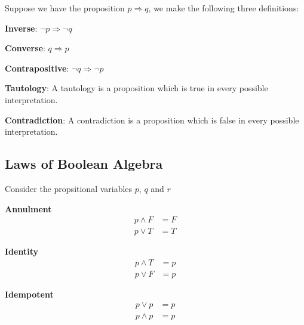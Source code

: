 \newpage
\noindent Suppose we have the proposition $p \Rightarrow q$, we make the following three definitions:
\begin{defn}\label{mod1:defn:Inverse}
	\textbf{Inverse}: $\lnot p \Rightarrow \lnot q$ 
\end{defn}

\begin{defn}\label{mod1:defn:Converse}
	\textbf{Converse}: $q \Rightarrow p$ 
\end{defn}

\begin{defn}\label{mod1:defn:Contrapositive}
	\textbf{Contrapositive}: $\lnot q \Rightarrow \lnot p$ 
\end{defn}

\begin{defn}\label{mod1:defn:Tautology}
	\textbf{Tautology}: A tautology is a proposition which is true in every possible interpretation.
\end{defn}

\begin{defn}\label{mod1:defn:Contradiction}
	\textbf{Contradiction}: A contradiction is a proposition which is false in every possible interpretation.
\end{defn}





\subsection{Laws of Boolean Algebra}\label{mod1:sexrionBooleanAlgebraLaws}



\noindent Consider the propsitional variables $p$, $q$ and $r$


\begin{law}\label{mod1:law:Annulment}
	\textbf{Annulment}
	\begin{align}
	p \land F &= F  \\
	p \lor T &= T 
	\end{align}
\end{law}


\begin{law}\label{mod1:law:Identity}
	\textbf{Identity}
	\begin{align}
	p \land T &= p  \\
	p \lor F &= p
	\end{align}
\end{law}

\begin{law}\label{mod1:law:Idempotent}
	\textbf{Idempotent}
	\begin{align}
	p \lor p &= p\\
	p \land p &= p
	\end{align}
\end{law}

